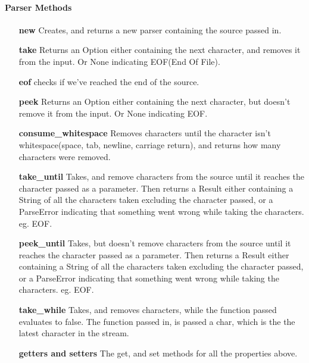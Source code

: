 \paragraph{Parser Methods}
\begin{itemize}
    
    \item[\textbf{new}] Creates, and returns a new parser containing the source passed in.
    
    \item[\textbf{take}] Returns an Option either containing the next character, and removes it from the input. Or None indicating EOF(End Of File).
    
    \item[\textbf{eof}] checks if we've reached the end of the source.
    
    \item[\textbf{peek}] Returns an Option either containing the next character, but doesn't remove it from the input. Or None indicating EOF.

    \item[\textbf{consume\_whitespace}] Removes characters until the character isn't whitespace(space, tab, newline, carriage return), and returns how many characters were removed.

    \item[\textbf{take\_until}] Takes, and remove characters from the source until it reaches the character passed as a parameter. Then returns a Result either containing a String of all the characters taken excluding the character passed, or a ParseError indicating that something went wrong while taking the characters. eg. EOF.

    \item[\textbf{peek\_until}] Takes, but doesn't remove characters from the source until it reaches the character passed as a parameter. Then returns a Result either containing a String of all the characters taken excluding the character passed, or a ParseError indicating that something went wrong while taking the characters. eg. EOF.
    
    \item[\textbf{take\_while}] Takes, and removes characters, while the function passed evaluates to false. The function passed in, is passed a char, which is the the latest character in the stream.
    
    \item[\textbf{getters and setters}] The get, and set methods for all the properties above.
\end{itemize}

